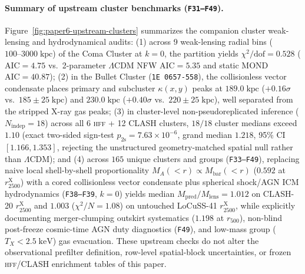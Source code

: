 \documentclass[11pt,a4paper]{article}
\newcommand{\HFF}{\textsc{hff}}
\begin{document}
\paragraph{Summary of upstream cluster benchmarks (\texttt{F31--F49}).}
Figure~\ref{fig:paper6-upstream-clusters} summarizes the companion cluster weak-lensing and hydrodynamical audits:
(1) across 9 weak-lensing radial bins ($100\text{--}3000\;\mathrm{kpc}$) of the Coma Cluster at $k=0$, the partition yields $\chi^2/\mathrm{dof}=0.528$ ($\mathrm{AIC}=4.75$ vs.\ 2-parameter $\Lambda$CDM NFW $\mathrm{AIC}=5.35$ and static MOND $\mathrm{AIC}=40.87$);
(2) in the Bullet Cluster (\texttt{1E 0657-558}), the collisionless vector condensate places primary and subcluster $\kappa(x,y)$ peaks at $189.0\;\mathrm{kpc}$ ($+0.16\sigma$ vs.\ $185\pm 25\;\mathrm{kpc}$) and $230.0\;\mathrm{kpc}$ ($+0.40\sigma$ vs.\ $220\pm 25\;\mathrm{kpc}$), well separated from the stripped X-ray gas peaks;
(3) in cluster-level non-pseudoreplicated inference ($N_{\mathrm{indep}}=18$) across all 6 \HFF{} + 12 CLASH clusters, $18/18$ cluster medians exceed $1.10$ (exact two-sided sign-test $p_{2\mathrm{s}}=7.63\times 10^{-6}$, grand median $1.218$, 95\% CI $[1.166,1.353]$, rejecting the unstructured geometry-matched spatial null rather than $\Lambda$CDM); and
(4) across $165$ unique clusters and groups (\texttt{F33--F49}), replacing naive local shell-by-shell proportionality $M_A(<r)\propto M_{\mathrm{bar}}(<r)$ ($0.592$ at $r_{2500}^{\mathrm{X}}$) with a cored collisionless vector condensate plus spherical shock/AGN ICM hydrodynamics (\texttt{F38--F39}, $k=0$) yields median $M_{\mathrm{pred}}/M_{\mathrm{lens}}=1.012$ on CLASH-20 $r_{2500}^{\mathrm{X}}$ and $1.003$ ($\chi^2/N=1.08$) on untouched LoCuSS-41 $r_{2500}^{\mathrm{X}}$, while explicitly documenting merger-clumping outskirt systematics ($1.198$ at $r_{500}$), non-blind post-freeze cosmic-time AGN duty diagnostics (\texttt{F49}), and low-mass group ($T_X<2.5\;\mathrm{keV}$) gas evacuation. These upstream checks do not alter the observational prefilter definition, row-level spatial-block uncertainties, or frozen \HFF{}/CLASH enrichment tables of this paper.
\end{document}
